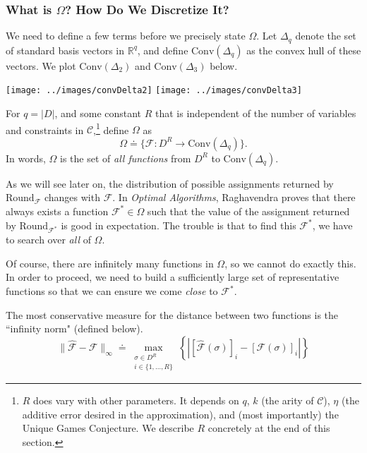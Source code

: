 \documentclass[letterpaper, 12pt]{article}
\numberwithin{equation}{section}
\begin{document}
\subsubsection{What is $\Omega$? How Do We Discretize It?}\label{subsubsec:UGDFS_discretize}
We need to define a few terms before we precisely state $\Omega$. Let $\Delta_q$ denote the set of standard basis vectors in $\mathbb{R}^q$, and define $\text{Conv}(\Delta_q)$ as the convex hull of these vectors. We plot $\text{Conv}(\Delta_2)$ and $\text{Conv}(\Delta_3)$ below.

\begin{center}
\texttt{[image: ../images/convDelta2]} \qquad
\texttt{[image: ../images/convDelta3]}
\end{center}

For $q = |D|$, and some constant $R$ that is independent of the number of variables and constraints in $\mathcal{C}$,\footnote{$R$ does vary with other parameters. It depends on $q$, $k$ (the arity of $\mathcal{C}$), $\eta$ (the additive error desired in the approximation), and (most importantly) the Unique Games Conjecture. We describe $R$ concretely at the end of this section.}  define $\Omega$ as
\begin{equation}
\Omega \doteq \{ \mathcal{F} : D^R \to \text{Conv}(\Delta_q) \}.
\end{equation}
In words, $\Omega$ is the set of \textit{all functions} from $D^R$ to $\text{Conv}(\Delta_q)$.

As we will see later on, the distribution of possible assignments returned by $\text{Round}_{\mathcal{F}}$ changes with $\mathcal{F}$. In \textit{Optimal Algorithms}, Raghavendra proves that there always exists a function $\mathcal{F}^* \in \Omega$ such that the value of the assignment returned by $\text{Round}_{\mathcal{F}^*}$ is good in expectation. The trouble is that to find this $\mathcal{F}^*$, we have to search over \textit{all} of $\Omega$.

Of course, there are infinitely many functions in $\Omega$, so we cannot do exactly this. In order to proceed, we need to build a sufficiently large set of representative functions so that we can ensure we come \textit{close} to  $\mathcal{F}^*$.

The most conservative measure for the distance between two functions is the ``infinity norm" (defined below).
\begin{equation}
\| \hat{\mathcal{F}} - \mathcal{F} \|_{\infty} \doteq 
	\max_{\substack{\sigma \in D^R \\ i \in \{1,\ldots,R \}}} \left\{\left|\left[\hat{\mathcal{F}}(\sigma)\right]_i - \left[\mathcal{F}(\sigma)\right]_i\right|\right\}
\end{equation}
\end{document}
